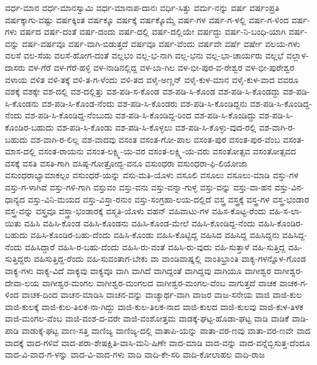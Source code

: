 ವರ್ಧ-ಮಾನ
ವರ್ಧ-ಮಾನಸ್ವಾಮಿ
ವರ್ಧ-ಮಾನಾಪ-ದಾನಃ
ವರ್ಧಿ-ಸಿತ್ತು
ವರ್ಮ-ನನ್ನು
ವರ್ಷ
ವರ್ಷಂಪ್ರತಿ
ವರ್ಷಕ್ಕಾಗು-ವಷ್ಟು
ವರ್ಷಕ್ಕಿಂತ
ವರ್ಷಕ್ಕೂ
ವರ್ಷಕ್ಕೆ
ವರ್ಷಕ್ಕೊಮ್ಮೆ
ವರ್ಷ-ಗಳ
ವರ್ಷ-ಗ-ಳಲ್ಲಿ
ವರ್ಷ-ಗ-ಳಿಂದ
ವರ್ಷ-ಗಳು
ವರ್ಷದ
ವರ್ಷ-ದಂತೆ
ವರ್ಷ-ದಂದು
ವರ್ಷ-ದಲ್ಲಿ
ವರ್ಷ-ದಲ್ಲಿಯೇ
ವರ್ಷದ್ದು
ವರ್ಷ-ನಿ-ಬಂಧಿ-ಯಾಗಿ
ವರ್ಷ-ವನ್ನು
ವರ್ಷ-ವರ್ಷವೂ
ವರ್ಷ-ವಾಗಿ-ಬಿಡುತ್ತದೆ
ವರ್ಷವೂ
ವರ್ಷ-ವೆಂದು
ವರ್ಷವೇ
ವರ್ಷೆ
ವರ್ಷೇ
ವಲಯ-ಗಳು
ವಲಸೆ
ವಲ-ಸೆಯ
ವಲಸೆ-ಹೋಗ-ದಂತೆ
ವಲ್ಲಭಂ
ವಲ್ಲ-ಭ-ನಾಗಿ
ವಲ್ಲ-ಭನು
ವಲ್ಲ-ಭಾ-ಚಾರ್ಯರು
ವಲ್ಲಭೆ
ವಲ್ಲಾಳ-ದಾಸರು
ವಳ-ಗೆರೆ
ವಳ-ಗೆರೆ-ಹಳ್ಳಿ
ವಳ-ನಾಡಿನಲ್ಲಿದ್ದ
ವಳ-ಬಾ-ಗಿಲ
ವಳ-ಭೀ-ಪುರ-ವ-ರೇಶ್ವರ
ವಳ-ಭೀ-ಪುರೇಶ್ವರ
ವಳಾಯ
ವಳಿತ
ವಳಿ-ತಕ್ಕೆ
ವಳಿ-ತ-ಗ-ಳೆಂದು
ವಳಿ-ತದ
ವಳೈ-ಅಣ್ಣನ್
ವಳೈ-ಕುಳ-ಮಾನ
ವಳೈ-ಕುಳ-ವಾದ
ವವರೂ
ವಶಕ್ಕೆ
ವಶಕ್ಕೇ
ವಶ-ದಲ್ಲಿ
ವಶ-ದಲ್ಲಿತ್ತು
ವಶ-ಪಡಿ-ಸ-ಕೊಂಡ
ವಶ-ಪಡಿ-ಸಿ-ಕೊಂಡ
ವಶ-ಪಡಿ-ಸಿ-ಕೊಂಡದ್ದು
ವಶ-ಪಡಿ-ಸಿ-ಕೊಂಡನು
ವಶ-ಪಡಿ-ಸಿ-ಕೊಂಡ-ನೆಂದು
ವಶ-ಪಡಿ-ಸಿ-ಕೊಂಡರು
ವಶ-ಪಡಿ-ಸಿ-ಕೊಂಡಿದ್ದನು
ವಶ-ಪಡಿ-ಸಿ-ಕೊಂಡಿದ್ದ-ನೆಂದು
ವಶ-ಪಡಿ-ಸಿ-ಕೊಂಡಿದ್ದ-ನೆಂಬುದು
ವಶ-ಪಡಿ-ಸಿ-ಕೊಂಡಿದ್ದ-ರಿಂದ
ವಶ-ಪಡಿ-ಸಿ-ಕೊಂಡಿದ್ದು
ವಶ-ಪಡಿ-ಸಿ-ಕೊಂಡಿರ-ಬಹುದು
ವಶ-ಪಡಿ-ಸಿ-ಕೊಂಡು
ವಶ-ಪಡಿ-ಸಿ-ಕೊಳ್ಳಲು
ವಶ-ಪಡಿ-ಸಿ-ಕೊಳ್ಳು-ವುದ-ರಲ್ಲಿ
ವಶ-ವಾಗಿ-ರ-ಬಹುದು
ವಶ-ವಾಗಿ-ರ-ಲಿಲ್ಲ
ವಶ-ವಾದವು
ವಸಂತ
ವಸಂತ-ಗೋ-ಪಾಲ
ವಸಂತ-ಪುರ
ವಸಂತ-ಪುರ-ವೆಂಬ
ವಸಂತ-ಮಾಸ-ದಲ್ಲಿ
ವಸಂತ-ರಾಯನು
ವಸಂತ-ಲಕ್ಷ್ಮಿ-ಯ-ವರ
ವಸಂತ-ಲಕ್ಷ್ಮಿ-ಯ-ವರು
ವಸಂತೋತ್ಸವ
ವಸಂತೋತ್ಸವದ
ವಸಕ್ಕೆ
ವಸತಿ
ವಸತಿ-ಗಾಗಿ
ವಸಿಷ್ಠ-ಗೋತ್ರೋದ್ಭ-ವನೂ
ವಸುಂಧರಾ
ವಸುಂಧರಾ-ಫಿ-ಲಿಯೋಜಾ
ವಸುಂಧರಾಭ್ಯಾಮಾಕಲ್ಪಂ
ವಸುಂಧರೆ-ಯನ್ನು
ವಸು-ಮತಿ-ಯೊಳು
ವಸೂಲಿ
ವಸೂಲು
ವಸೂಲು-ಮಾಡಿ
ವಸ್ತು-ಗಳ
ವಸ್ತು-ಗ-ಳಾಗಿವೆ
ವಸ್ತು-ಗಳಿ-ಗಾಗಿ
ವಸ್ತುವಂ
ವಸ್ತು-ವನು
ವಸ್ತು-ವನ್ನಾ-ಗುಳ್ಳ
ವಸ್ತು-ವನ್ನು
ವಸ್ತು-ವಾ-ಹನ
ವಸ್ತು-ವಿನ-ಧಾನ್ಯದ
ವಸ್ತು-ವಿನಿ-ಮಯದ
ವಸ್ತು-ವಿಸ್ತಾ-ರನುಂ
ವಸ್ತು-ಸಂಗ್ರಹಾ-ಲಯ-ದಲ್ಲಿದೆ
ವಸ್ತ್ರ
ವಸ್ತ್ರಕ್ಕೆ
ವಸ್ತ್ರ-ಗಳ
ವಸ್ತ್ರ-ಭಂಡಾರ
ವಸ್ತ್ರ-ವನ್ನು
ವಸ್ತ್ರವೂ
ವಸ್ತ್ರಾ-ಭಂಡಾರಕ್ಕೆ
ವಸ್ಮತಿ-ಯೊಳು
ವಹನ್
ವಹಿವಾಟು-ಗಳ
ವಹಿಸ-ಕೊಟ್ಟ-ರೆಂದು
ವಹಿ-ಸ-ಲಾ-ಯಿತು
ವಹಿಸಿ
ವಹಿಸಿ-ಕೊಂಡ
ವಹಿಸಿ-ಕೊಂಡನು
ವಹಿಸಿ-ಕೊಂಡ-ಮೇಲೆ
ವಹಿಸಿ-ಕೊಂಡಿದ್ದ-ನೆಂದು
ವಹಿಸಿ-ಕೊಂಡಿರ-ಬಹುದು
ವಹಿಸಿ-ಕೊಂಡಿರ-ಬಹು-ದೆಂದು
ವಹಿಸಿ-ಕೊಂಡು
ವಹಿಸಿ-ಕೊಟ್ಟಿದ್ದ
ವಹಿಸಿದ
ವಹಿಸಿದ್ದ
ವಹಿಸಿದ್ದನು
ವಹಿಸಿದ್ದ-ನೆಂದು
ವಹಿಸಿದ್ದಾರೆ
ವಹಿಸಿ-ರ-ಬಹು-ದೆಂದು
ವಹಿಸಿ-ರು-ವಂತೆ
ವಹಿಸಿ-ರು-ವುದು
ವಹಿ-ಸುತ್ತಾಳೆ
ವಹಿ-ಸುತ್ತಿದ್ದ
ವಹಿ-ಸುತ್ತಿದ್ದರು
ವಹಿಸುತ್ತಿದ್ದ-ರೆಂದು
ವಹಿ-ಸುವಂತಾಗ-ಬೇಕು
ವಾ
ವಾಂಡಿವಾಷ್ನಲ್ಲಿ
ವಾಂತಿಭ್ರಾಂತಿ
ವಾಕ್ಯ-ಗಳನ್ನೊಳ-ಗೊಂಡ
ವಾಕ್ಯ-ಗಳು
ವಾಕ್ಯ-ವಿದೆ
ವಾಕ್ಯವು
ವಾಕ್ಯವೂ
ವಾಗಿ
ವಾಗಿದೆ
ವಾಗಿದ್ದಂತೆ
ವಾಗಿದ್ದವು
ವಾಗಿಯೂ
ವಾಗೀಶ್ವರ
ವಾಗೀಶ್ವರ-ದೇವಾ-ಲಯ
ವಾಗೀಶ್ವರ-ಮಂಗಲ
ವಾಗೀಶ್ವರ-ಮಂಗಲದ
ವಾಗೀಶ್ವರ-ಮಂಗಲ-ವೆಂಬ
ವಾಗುತ್ತದೆ
ವಾಚಕ
ವಾಚಕ-ಗ-ಳಿಂದ
ವಾಚಕ-ದಿಂದ
ವಾಚನ-ಮಾಡಿಸಿ
ವಾಚನ-ವನ್ನು
ವಾಚ್ಯಾರ್ಥ-ವಾಗಿ
ವಾಜರ
ವಾಜ-ಸನೇಯ
ವಾಜಿ
ವಾಜಿ-ಕುಲ
ವಾಜಿ-ಕುಲಕ್ಕೆ
ವಾಜಿ-ಕುಲ-ತಿಲಕ-ನಾ-ಗಿದ್ದು
ವಾಜಿ-ಕುಲ-ತಿಲಕ-ನಾದ
ವಾಜಿ-ಕುಲದ
ವಾಜಿ-ಕುಲವು
ವಾಜಿ-ಕುಳ-ತಿಳಕ
ವಾಜಿ-ಮಂಗಲ-ವೆಂಬ
ವಾಜಿ-ವಂಶ-ದ-ವರೇ
ವಾಜಿ-ವಂಶೋತ್ತಮ
ವಾಡಕ್ಕೆ-ಘಟ್ಟ-ಹೊಡಾ-ಘಟ್ಟ
ವಾಡಿ
ವಾಡಿಕೆ
ವಾಡಿ-ಪಾಡಿ
ವಾಡುಕ್ಕೆ-ಘಟ್ಟ
ವಾಣ-ಸತ್ತಿ
ವಾಣಿಜ್ಯ
ವಾಣಿಜ್ಯ-ದಲ್ಲಿ
ವಾತಾಪಿ-ಯನ್ನು
ವಾತಾ-ವರ-ಣವು
ವಾತಾ-ವರ-ಣವೇ
ವಾದ
ವಾದಕ್ಕೆ
ವಾದ-ಗಳಿವೆ
ವಾದ-ಪರಾ-ಶೇಷಕ್ಷಿತಿ-ವಾಸಿ-ಮನಿ-ಷಿಣೇ
ವಾದ-ಮಾಡಿ
ವಾದ-ವನ್ನು
ವಾದ-ವನ್ನೆಬ್ಬಿಸುತ್ತ-ದೆಂದೂ
ವಾದ-ವಿ-ವಾದ-ಗ-ಳನ್ನು
ವಾದ-ವಿ-ವಾದ-ಗಳು
ವಾದಿ
ವಾದಿ-ಕೇ-ಸರಿ
ವಾದಿ-ಕೋಲಾಹಲ
ವಾದಿ-ರಾಜ

